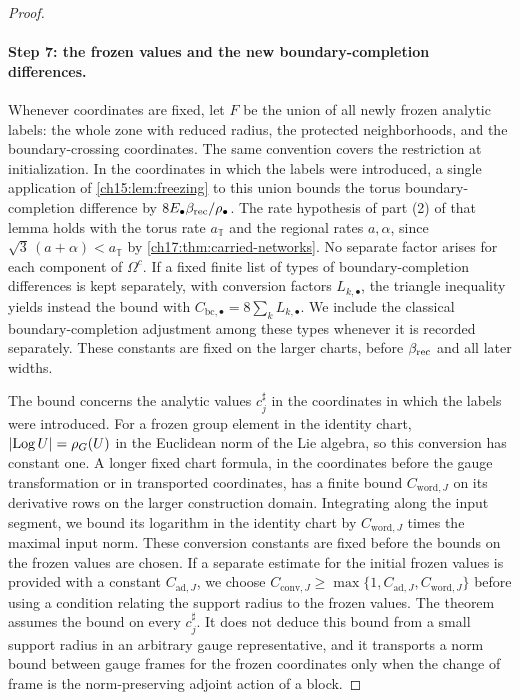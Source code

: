 \begin{proof}
\paragraph{Step 7: the frozen values and the new boundary-completion differences.}
Whenever coordinates are fixed, let $F$ be the union of all newly frozen analytic labels: the whole zone with reduced radius, the protected neighborhoods, and the boundary-crossing coordinates. The same convention covers the restriction at initialization. In the coordinates in which the labels were introduced, a single application of \cref{ch15:lem:freezing} to this union bounds the torus boundary-completion difference by $8E_\bullet\beta_{\mathrm{rec}}/\rho_\bullet$. The rate hypothesis of part (2) of that lemma holds with the torus rate $a_{\mathbb T}$ and the regional rates $a,\alpha$, since $\sqrt3\,(a+\alpha)<a_{\mathbb T}$ by \cref{ch17:thm:carried-networks}. No separate factor arises for each component of $\Omega^c$. If a fixed finite list of types of boundary-completion differences is kept separately, with conversion factors $L_{k,\bullet}$, the triangle inequality yields instead the bound with $C_{\mathrm{bc},\bullet}=8\sum_kL_{k,\bullet}$. We include the classical boundary-completion adjustment among these types whenever it is recorded separately. These constants are fixed on the larger charts, before $\beta_{\mathrm{rec}}$ and all later widths.

The bound concerns the analytic values $c_j^\sharp$ in the coordinates in which the labels were introduced. For a frozen group element in the identity chart, $\lvert \operatorname{Log} U\rvert=\rho_G(U)$ in the Euclidean norm of the Lie algebra, so this conversion has constant one. A longer fixed chart formula, in the coordinates before the gauge transformation or in transported coordinates, has a finite bound $C_{\mathrm{word},J}$ on its derivative rows on the larger construction domain. Integrating along the input segment, we bound its logarithm in the identity chart by $C_{\mathrm{word},J}$ times the maximal input norm. These conversion constants are fixed before the bounds on the frozen values are chosen. If a separate estimate for the initial frozen values is provided with a constant $C_{\mathrm{ad},J}$, we choose $C_{\mathrm{conv},J}\ge\max\{1,C_{\mathrm{ad},J},C_{\mathrm{word},J}\}$ before using a condition relating the support radius to the frozen values. The theorem assumes the bound on every $c_j^\sharp$. It does not deduce this bound from a small support radius in an arbitrary gauge representative, and it transports a norm bound between gauge frames for the frozen coordinates only when the change of frame is the norm-preserving adjoint action of a block.


\end{proof}
